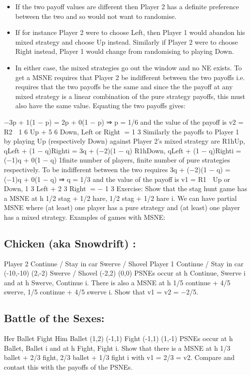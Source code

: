 \begin{itemize}
\item If the two payoff values are different then Player 2 has a definite preference between the two and so would not want to randomise. 
\item If for instance Player 2 were to choose Left, then Player 1 would abandon his mixed strategy and choose Up instead. Similarly if Player 2
were to choose Right instead, Player 1 would change from randomising to playing Down.
\item In either case, the mixed strategies go out the window and no NE exists. To get a MSNE requires that Player 2 be indifferent between the two payoffs i.e. requires that the two payoffs be the same and since the the payoff at any mixed strategy is a linear combination
of the pure strategy payoffs, this must also have the same value. Equating the two payoffs
gives:
\end{itemize}
−3p + 1(1 − p) = 2p + 0(1 − p)
⇒ p = 1/6
and the value of the payoff is
v2 = R2

1
6
Up + 5
6
Down, Left or Right
=
1
3
Similarly the payoffs to Player 1 by playing Up (respectively Down) against Player 2’s
mixed strategy are
R1hUp, qLeft + (1 − q)Righti = 3q + (−2)(1 − q)
R1hDown, qLeft + (1 − q)Righti = (−1)q + 0(1 − q)
1finite number of players, finite number of pure strategies
respectively. To be indifferent between the two requires
3q + (−2)(1 − q) = (−1)q + 0(1 − q)
⇒ q = 1/3
and the value of the payoff is
v1 = R1

Up or Down,
1
3
Left + 2
3
Right
= −
1
3
Exercise: Show that the stag hunt game has a MSNE at h 1/2 stag + 1/2 hare, 1/2 stag
+ 1/2 hare i.
We can have partial MSNE where (at least) one player has a pure strategy and (at least)
one player has a mixed strategy.
Examples of games with MSNE:
\subsection{Chicken (aka Snowdrift) :}
Player 2
Continue / Stay in car Swerve / Shovel
Player 1 Continue / Stay in car (-10,-10) (2,-2)
Swerve / Shovel (-2,2) (0,0)
PSNEs occur at h Continue, Swerve i and at h Swerve, Continue i. There is also
a MSNE at h 1/5 continue + 4/5 swerve, 1/5 continue + 4/5 swerve i. Show that
v1 = v2 = −2/5.
\subsection{Battle of the Sexes:}
Her
Ballet Fight
Him Ballet (1,2) (-1,1)
Fight (-1,1) (1,-1)
PSNEs occur at h Ballet, Ballet i and at h Fight, Fight i. Show that there is a
MSNE at h 1/3 ballet + 2/3 fight, 2/3 ballet + 1/3 fight i with v1 = 2/3 = v2.
Compare and contast this with the payoffs of the PSNEs.
